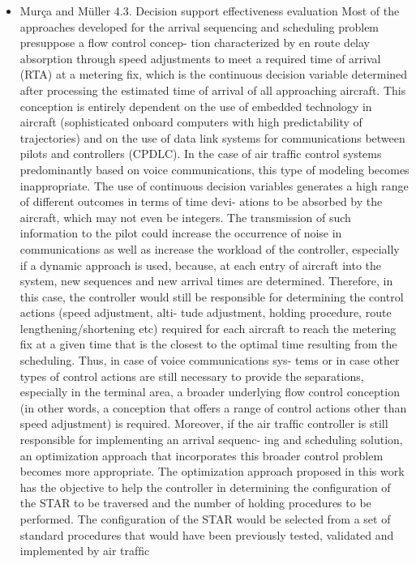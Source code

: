 \documentclass{aer1315-pretty}
\begin{document}
\begin{itemize}
\item Mur\c{c}a and M{\"u}ller \cite{Murca:2015}
4.3. Decision support effectiveness evaluation
   Most of the approaches developed for the arrival sequencing and scheduling problem presuppose a ﬂow control concep-
tion characterized by en route delay absorption through speed adjustments to meet a required time of arrival (RTA) at a
metering ﬁx, which is the continuous decision variable determined after processing the estimated time of arrival of all
approaching aircraft. This conception is entirely dependent on the use of embedded technology in aircraft (sophisticated
onboard computers with high predictability of trajectories) and on the use of data link systems for communications between
pilots and controllers (CPDLC).
   In the case of air trafﬁc control systems predominantly based on voice communications, this type of modeling becomes
inappropriate. The use of continuous decision variables generates a high range of different outcomes in terms of time devi-
ations to be absorbed by the aircraft, which may not even be integers. The transmission of such information to the pilot could
increase the occurrence of noise in communications as well as increase the workload of the controller, especially if a dynamic
approach is used, because, at each entry of aircraft into the system, new sequences and new arrival times are determined.
Therefore, in this case, the controller would still be responsible for determining the control actions (speed adjustment, alti-
tude adjustment, holding procedure, route lengthening/shortening etc) required for each aircraft to reach the metering ﬁx at
a given time that is the closest to the optimal time resulting from the scheduling. Thus, in case of voice communications sys-
tems or in case other types of control actions are still necessary to provide the separations, especially in the terminal area, a broader underlying ﬂow control conception (in other words, a conception that offers a range of control actions other than
speed adjustment) is required. Moreover, if the air trafﬁc controller is still responsible for implementing an arrival sequenc-
ing and scheduling solution, an optimization approach that incorporates this broader control problem becomes more
appropriate.
    The optimization approach proposed in this work has the objective to help the controller in determining the conﬁguration
of the STAR to be traversed and the number of holding procedures to be performed. The conﬁguration of the STAR would be
selected from a set of standard procedures that would have been previously tested, validated and implemented by air trafﬁc

\end{itemize}
\end{document}
